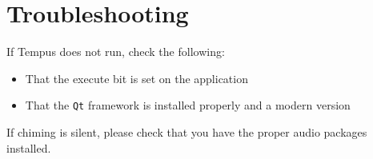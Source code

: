 \section{Troubleshooting}

If Tempus does not run, check the following:
\begin{itemize}
    \item That the execute bit is set on the application
    \item That the \texttt{Qt} framework is installed properly and a modern version
\end{itemize}

If chiming is silent, please check that you have the proper audio packages installed.